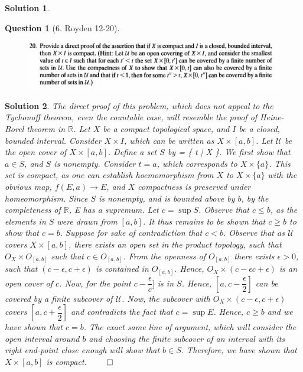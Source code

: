 \documentclass{article} %
\def\eQb#1\eQe{\begin{eqnarray*}#1\end{eqnarray*}}
\theoremstyle{quest}
\newtheorem*{question}{Question}
\newtheorem*{solution}{Solution}
\begin{document}
\begin{solution}
\end{solution}

\newpage

\begin{question}[6. Royden 12-20]
\hfill
\begin{figure}[h!]
  \centering
    \includegraphics[width=1\textwidth]{12-20}
\end{figure}
\end{question}
\begin{solution}
The direct proof of this problem, which does not appeal to the Tychonoff 
theorem, even the countable case,
will resemble the proof of Heine-Borel theorem in $\mathbb{R}$.
Let $X$ be a compact topological space, and $I$ be a closed, bounded
interval. Consider $X \times I$, which can be written as $X \times [a,b]$.
Let $\mathscr{U}$ be the open cover of $X \times [a,b]$. Define a set $S$
by 
\eQb
S = \{ t \in [a,b] \> | \> X \times [a,t] \>  \>  \}. 
\eQe
We first show that $a \in S$, and $S$ is nonempty. Consider $t = a$,
which corresponds to $X \times \{ a \}$. This set is compact, as one can
establish hoemomorphism from $X$ to $X \times \{ a\}$ with the obvious map,
$f(E,a) \to E$, and $X$ compactness is preserved under homeomorphism.
Since $S$ is nonempty, and 
is bounded above by $b$, by the completeness of $\mathbb{R}$, E has 
a supremum. Let $c = \sup S$. Observe that $c \leq b$, as the elements in
$S$ were drawn from $[a,b]$. It thus remains to be shown that $c \geq b$
to show that $c = b$. Suppose for sake of contradiction
that $c < b$. Observe that as $\mathscr{U}$ covers $X \times [a,b]$, 
there exists an open set in the product topology, such that $O_X \times
O_{[a,b]}$ such that $c \in O_{[a,b]}$. From the openness of $O_{[a,b]}$
there exists $\epsilon > 0$, such that  $(c-\epsilon, c+\epsilon)$ is
contained in $O_{[a,b]}$. Hence, $O_X \times (c-\epsilon c+\epsilon)$ is
an open cover of $c$. Now, for the point $c - \dfrac{\epsilon}{c}]$ is 
in $S$. Hence, $[a,c-\dfrac{\epsilon}{2}]$ can be covered by a finite 
subcover of $\mathscr{U}$. Now, the subcover with $O_X \times 
(c-\epsilon, c+ \epsilon)$ covers $[a, c+ \dfrac{\epsilon}{2}]$ and 
contradicts the fact that $c = \sup E$. 
Hence, $c \geq b$ and we have shown that
$c=b$. The exact same line of argument, which will consider the open interval
around $b$ and choosing the finite subcover of an interval with its right 
end-point close enough  will show that $b \in S$. Therefore, we have
shown that $X \times [a,b]$ is compact. 
\hfill $\qed$
\end{solution}
\end{document}
